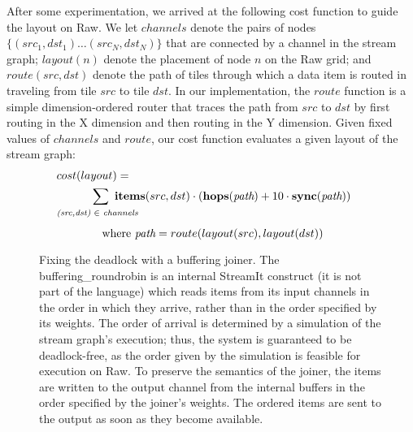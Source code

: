 After some experimentation, we arrived at the following cost function
to guide the layout on Raw.  We let $channels$ denote the pairs of
nodes $\{(src_1, dst_1) \dots (src_N, dst_N)\}$ that are connected by
a channel in the stream graph; $layout(n)$ denote the placement of
node $n$ on the Raw grid; and \\ $route(src, dst)$ denote the path of
tiles through which a data item is routed in traveling from tile $src$
to tile $dst$.  In our implementation, the $route$ function is a
simple dimension-ordered router that traces the path from $src$ to
$dst$ by first routing in the X dimension and then routing in the Y
dimension.  Given fixed values of $channels$ and $route$, our cost
function evaluates a given layout of the stream graph:
\begin{align*}
& cost(layout) = & ~ \\ 
& ~~~~~~~~~\sum ~ {\bf items}(src,dst) \cdot \left( {\bf hops}(\mt{path})
   + 10 \cdot {\bf sync}(\mt{path}) \right) \\
  & \raisebox{4pt}[4pt]{\scriptsize {\it (src,dst)} $\in$ {\it channels}} \\
  & ~~~~~~~~~~~~\mbox{where } \mt{path} = route(layout(src), layout(dst))
\end{align*}

\begin{figure}
\centering
{}
\vspace{-6pt}
\caption{\protect\small Example of deadlock in a splitjoin.  As the
joiner is reading items from the stream on the left, items accumulate
in the channels on the right.  On Raw, senders will block once a
channel has four items in it.  Thus, once 10 items have passed through
the joiner, the system is deadlocked, as the joiner is trying to read
from the left, but the stream on the right is blocked.  
\protect\label{fig:joiner-dead}}
\vspace{28pt}
\vspace{-6pt}
\caption{\protect\small Fixing the deadlock with a buffering joiner.
The buffering\_roundrobin is an internal StreamIt construct (it is not
part of the language) which reads items from its input channels in the
order in which they arrive, rather than in the order specified by its
weights.  The order of arrival is determined by a simulation of the
stream graph's execution; thus, the system is guaranteed to be
deadlock-free, as the order given by the simulation is feasible for
execution on Raw.  To preserve the semantics of the joiner, the items
are written to the output channel from the internal buffers in the
order specified by the joiner's weights.  The ordered items are sent
to the output as soon as they become available.
\protect\label{fig:joiner-live}}
\vspace{-12pt}
\end{figure}

